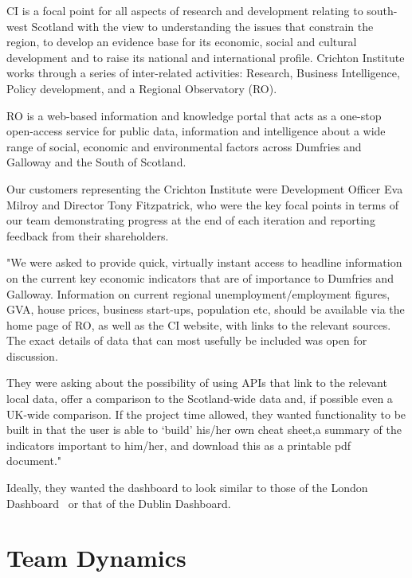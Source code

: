 \documentclass{l3proj}
\begin{document}
CI is a focal point for all aspects of research and development relating to south-west Scotland with the view to understanding the
issues that constrain the region, to develop an evidence base for its economic, social and cultural development and to raise its
national and international profile. Crichton Institute works through a series of inter-related activities: Research,
Business Intelligence, Policy development, and a Regional Observatory (RO).

RO is a web-based information and knowledge portal that acts as a one-stop open-access service for public data, information and
intelligence about a wide range of social, economic and environmental factors across Dumfries and Galloway and the South of Scotland.

Our customers representing the Crichton Institute were Development Officer Eva Milroy and Director Tony Fitzpatrick, who were the key
focal points in terms of our team demonstrating progress at the end of each iteration and reporting feedback from their shareholders.


"We were asked to provide quick, virtually instant access to headline information on the current key economic indicators that are of
importance to Dumfries and Galloway. Information on current regional unemployment/employment figures, GVA, house prices, business start-ups,
population etc, should be available via the home page of RO, as well as the CI website, with links to the relevant sources.
The exact details of data that can most usefully be included was open for discussion.

They were asking about the possibility of using APIs that link to the relevant local data, offer a comparison to the Scotland-wide data and,
if possible even a UK-wide comparison. If the project time allowed, they wanted functionality to be built in that the user is able to ‘build’ his/her
own cheat sheet,a summary of the indicators important to him/her, and download this as a printable pdf document."


Ideally, they wanted the dashboard to look similar to those of the London Dashboard~\cite{LondonDashboard} or that of the Dublin Dashboard\cite{DublinDashboard}.


\section{Team Dynamics}
\end{document}
